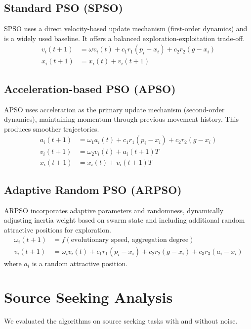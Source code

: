 \documentclass[a4paper,12pt]{article}
\begin{document}
\subsection{Standard PSO (SPSO)}
SPSO uses a direct velocity-based update mechanism (first-order dynamics) and is a widely used baseline. It offers a balanced exploration-exploitation trade-off.
\begin{align}
    v_i(t+1) &= \omega v_i(t) + c_1 r_1(p_i - x_i) + c_2 r_2(g - x_i) \\
    x_i(t+1) &= x_i(t) + v_i(t+1)
\end{align}

\subsection{Acceleration-based PSO (APSO)}
APSO uses acceleration as the primary update mechanism (second-order dynamics), maintaining momentum through previous movement history. This produces smoother trajectories.
\begin{align}
    a_i(t+1) &= \omega_1 a_i(t) + c_1 r_1(p_i - x_i) + c_2 r_2(g - x_i) \\
    v_i(t+1) &= \omega_2 v_i(t) + a_i(t+1)T \\
    x_i(t+1) &= x_i(t) + v_i(t+1)T
\end{align}

\subsection{Adaptive Random PSO (ARPSO)}
ARPSO incorporates adaptive parameters and randomness, dynamically adjusting inertia weight based on swarm state and including additional random attractive positions for exploration.
\begin{align}
    \omega_i(t+1) &= f(\text{evolutionary speed, aggregation degree}) \\
    v_i(t+1) &= \omega_i v_i(t) + c_1 r_1(p_i-x_i) + c_2 r_2(g-x_i) + c_3 r_3(a_i-x_i)
\end{align}
where $a_i$ is a random attractive position.

\section{Source Seeking Analysis}
We evaluated the algorithms on source seeking tasks with and without noise.
\end{document}
